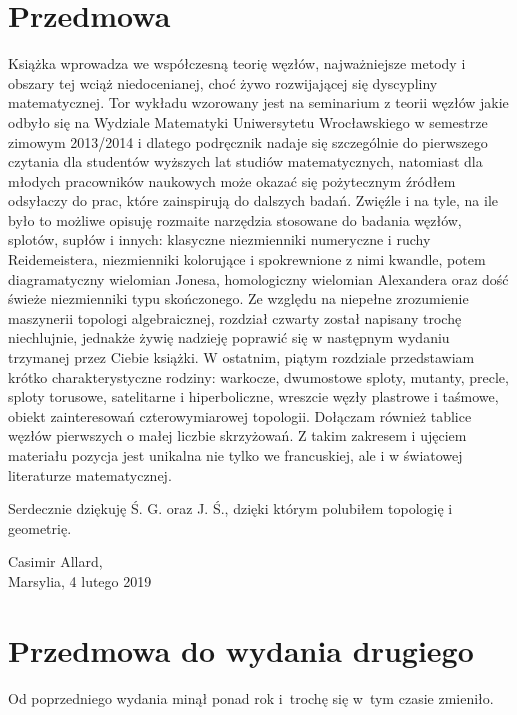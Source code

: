 

\section*{Przedmowa}
Książka wprowadza we współczesną teorię węzłów, najważniejsze metody i obszary tej wciąż niedocenianej, choć żywo rozwijającej się dyscypliny matematycznej.
Tor wykładu wzorowany jest na seminarium z teorii węzłów jakie odbyło się na Wydziale Matematyki Uniwersytetu Wrocławskiego w semestrze zimowym 2013/2014 i dlatego podręcznik nadaje się szczególnie do pierwszego czytania dla studentów wyższych lat studiów matematycznych, natomiast dla młodych pracowników naukowych może okazać się pożytecznym źródłem odsyłaczy do prac, które zainspirują do dalszych badań.
Zwięźle i na tyle, na ile było to możliwe opisuję rozmaite narzędzia stosowane do badania węzłów, splotów, supłów i innych: klasyczne niezmienniki numeryczne i ruchy Reidemeistera, niezmienniki kolorujące i spokrewnione z nimi kwandle, potem diagramatyczny wielomian Jonesa, homologiczny wielomian Alexandera oraz dość świeże niezmienniki typu skończonego.
Ze względu na niepełne zrozumienie maszynerii topologi algebraicznej, rozdział czwarty został napisany trochę niechlujnie, jednakże żywię nadzieję poprawić się w następnym wydaniu trzymanej przez Ciebie książki.
W ostatnim, piątym rozdziale przedstawiam krótko charakterystyczne rodziny: warkocze, dwumostowe sploty, mutanty, precle, sploty torusowe, satelitarne i hiperboliczne, wreszcie węzły plastrowe i taśmowe, obiekt zainteresowań czterowymiarowej topologii.
Dołączam również tablice węzłów pierwszych o małej liczbie skrzyżowań.
Z takim zakresem i ujęciem materiału pozycja jest unikalna nie tylko we francuskiej, ale i w światowej literaturze matematycznej.

Serdecznie dziękuję Ś. G. oraz J. Ś., dzięki którym polubiłem topologię i geometrię.

\begin{flushright}
Casimir Allard,\\Marsylia, 4 lutego 2019
\end{flushright}

\section*{Przedmowa do wydania drugiego}
Od poprzedniego wydania minął ponad rok i~trochę się w~tym czasie zmieniło.

